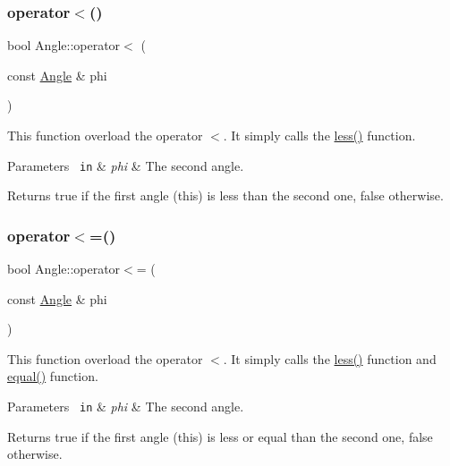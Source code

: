 \subsubsection{\texorpdfstring{operator$<$()}{operator<()}}
{\footnotesize\ttfamily bool Angle\+::operator$<$ (\begin{DoxyParamCaption}\item[{const \mbox{\hyperlink{class_angle}{Angle}} \&}]{phi }\end{DoxyParamCaption})\hspace{0.3cm}{\ttfamily [inline]}}

This function overload the operator $<$. It simply calls the {\ttfamily \mbox{\hyperlink{class_angle_a4e25c0ed5a92eb8af995a038c70f4e26}{less()}}} function. 
\begin{DoxyParams}[1]{Parameters}
\mbox{\texttt{ in}}  & {\em phi} & The second angle. \\
\hline
\end{DoxyParams}
\begin{DoxyReturn}{Returns}
{\ttfamily true} if the first angle (this) is less than the second one, {\ttfamily false} otherwise. 
\end{DoxyReturn}
\mbox{\label{class_angle_ad18dd2a58b59f2b8d57431cf122f026c}} 
\subsubsection{\texorpdfstring{operator$<$=()}{operator<=()}}
{\footnotesize\ttfamily bool Angle\+::operator$<$= (\begin{DoxyParamCaption}\item[{const \mbox{\hyperlink{class_angle}{Angle}} \&}]{phi }\end{DoxyParamCaption})\hspace{0.3cm}{\ttfamily [inline]}}

This function overload the operator $<$. It simply calls the {\ttfamily \mbox{\hyperlink{class_angle_a4e25c0ed5a92eb8af995a038c70f4e26}{less()}}} function and {\ttfamily \mbox{\hyperlink{class_angle_a21d2e7c68957afdd5c7edf3efd3e0bdc}{equal()}}} function. 
\begin{DoxyParams}[1]{Parameters}
\mbox{\texttt{ in}}  & {\em phi} & The second angle. \\
\hline
\end{DoxyParams}
\begin{DoxyReturn}{Returns}
{\ttfamily true} if the first angle (this) is less or equal than the second one, {\ttfamily false} otherwise. 
\end{DoxyReturn}
\mbox{\label{class_angle_a93da39f08e2e110e278bb94d1c279ac6}} 
